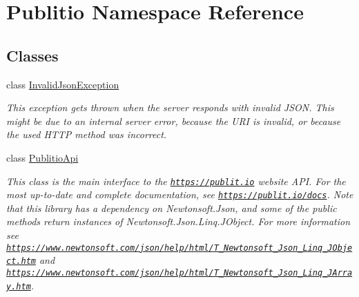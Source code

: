 \hypertarget{namespacePublitio}{}\section{Publitio Namespace Reference}
\label{namespacePublitio}
\subsection*{Classes}
\begin{DoxyCompactItemize}
\item 
class \hyperlink{classPublitio_1_1InvalidJsonException}{Invalid\+Json\+Exception}
\begin{DoxyCompactList}\small\item\em This exception gets thrown when the server responds with invalid J\+S\+ON. This might be due to an internal server error, because the U\+RI is invalid, or because the used H\+T\+TP method was incorrect.\end{DoxyCompactList}\item 
class \hyperlink{classPublitio_1_1PublitioApi}{Publitio\+Api}
\begin{DoxyCompactList}\small\item\em This class is the main interface to the \href{https://publit.io}{\tt https\+://publit.\+io} website A\+PI. For the most up-\/to-\/date and complete documentation, see \href{https://publit.io/docs}{\tt https\+://publit.\+io/docs}. Note that this library has a dependency on {\ttfamily Newtonsoft.\+Json}, and some of the public methods return instances of {\ttfamily Newtonsoft.\+Json.\+Linq.\+J\+Object}. For more information see \href{https://www.newtonsoft.com/json/help/html/T_Newtonsoft_Json_Linq_JObject.htm}{\tt https\+://www.\+newtonsoft.\+com/json/help/html/\+T\+\_\+\+Newtonsoft\+\_\+\+Json\+\_\+\+Linq\+\_\+\+J\+Object.\+htm} and \href{https://www.newtonsoft.com/json/help/html/T_Newtonsoft_Json_Linq_JArray.htm}{\tt https\+://www.\+newtonsoft.\+com/json/help/html/\+T\+\_\+\+Newtonsoft\+\_\+\+Json\+\_\+\+Linq\+\_\+\+J\+Array.\+htm}.\end{DoxyCompactList}\end{DoxyCompactItemize}
